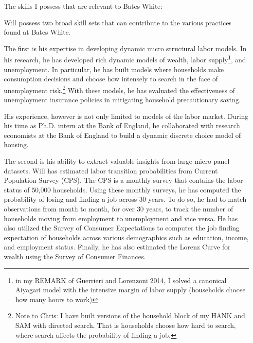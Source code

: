 
The skills I possess that are relevant to Bates White:
\vspace{.2cm}

Will possess two broad skill sets that can contribute to the various practices found at Bates White. 

The first is his expertise in developing dynamic micro structural labor models. In his research, he has developed rich dynamic models of wealth, labor supply\footnote{ in my REMARK of Guerrieri and Lorenzoni 2014, I solved a canonical Aiyagari model with the intensive margin of labor supply (households choose how many hours to work)}, and unemployment. In particular, he has built models where households make consumption decisions and choose how intensely to search in the face of unemployment risk.\footnote{Note to Chris: I have built versions of the household block of my HANK and SAM with directed search. That is households choose how hard to search, where search affects the probability of finding a job.} With these models, he has evaluated the effectiveness of unemployment insurance policies in mitigating household precautionary saving. 

His experience, however is not only limited to models of the labor market. During his time as Ph.D. intern at the Bank of England, he collaborated with research economists at the Bank of England to build a dynamic discrete choice model of housing. 

The second is his ability to extract valuable insights from large micro panel datasets. Will has estimated labor transition probabilities from Current Population Survey (CPS). The CPS is a monthly survey that contains the labor status of 50,000 households. Using these monthly surveys, he has computed the probability of losing and finding a job across 30 years. To do so, he had to match observations from month to month, for over 30 years, to track the number of households moving from employment to unemployment and vice versa. He has also utilized the Survey of Consumer Expectations to computer the job finding expectation of households across various demographics such as education, income, and employment status. Finally, he has also estimated the Lorenz Curve for wealth using the Survey of Consumer Finances. 
